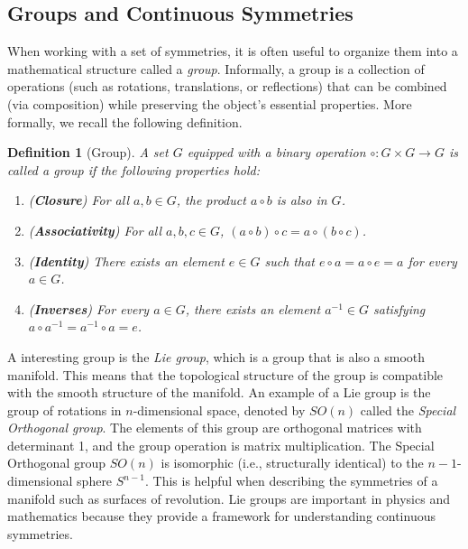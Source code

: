 \documentclass[12pt]{article}
\newtheorem{definition}{Definition}[section]
\begin{document}
\subsection{Groups and Continuous Symmetries}
When working with a set of symmetries, it is often useful to organize them into a mathematical structure called a \emph{group}.
Informally, a group is a collection of operations (such as rotations, translations, or reflections) that can be combined (via composition) while preserving the object's essential properties. 
More formally, we recall the following definition.

\begin{definition}[Group]
	A set $G$ equipped with a binary operation $\circ: G \times G \to G$ is called a \emph{group} if the following properties hold:
	\begin{enumerate}
	    \item (\textbf{Closure}) For all $a,b \in G$, the product $a \circ b$ is also in $G$.
	    \item (\textbf{Associativity}) For all $a,b,c \in G$, $(a \circ b) \circ c = a \circ (b \circ c)$.
	    \item (\textbf{Identity}) There exists an element $e \in G$ such that $e \circ a = a \circ e = a$ for every $a \in G$.
	    \item (\textbf{Inverses}) For every $a \in G$, there exists an element $a^{-1} \in G$ satisfying $a \circ a^{-1} = a^{-1} \circ a = e$.
	\end{enumerate}
\end{definition}

A interesting group is the \emph{Lie group}, which is a group that is also a smooth manifold.
This means that the topological structure of the group is compatible with the smooth structure of the manifold.
An example of a Lie group is the group of rotations in $n$-dimensional space, denoted by $SO(n)$ called the \emph{Special Orthogonal group}.
The elements of this group are orthogonal matrices with determinant 1, and the group operation is matrix multiplication.
The Special Orthogonal group $SO(n)$ is isomorphic (i.e., structurally identical) to the $n-1$-dimensional sphere $S^{n-1}$.
This is helpful when describing the symmetries of a manifold such as surfaces of revolution.
Lie groups are important in physics and mathematics because they provide a framework for understanding continuous symmetries.
\end{document}
